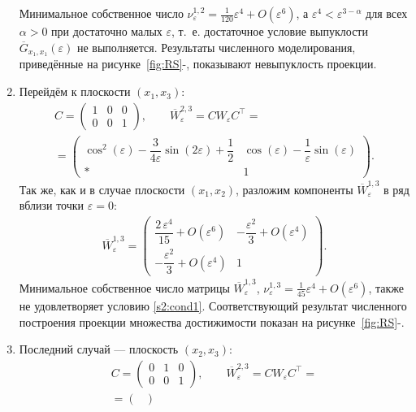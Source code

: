 \documentclass[../main.tex]{subfiles}
\begin{document}
\begin{enumerate}
 Минимальное собственное число $ \nu^{1,2}_{\varepsilon} = \frac{1}{120}\varepsilon^4 + O(\varepsilon^6)$, а $ \varepsilon^4 < \varepsilon^{3-\alpha} $ для всех $ \alpha > 0 $ при достаточно малых $ \varepsilon $, т.~е. достаточное условие выпуклости $ \overline{G}_{x_1, x_1}(\varepsilon) $ не выполняется. 
Результаты численного моделирования, приведённые на рисунке~\ref{fig:RS}-, показывают невыпуклость проекции. 
 \item Перейдём к плоскости $ (x_1,x_3) $:
 \begin{gather*}
 C = \begin{pmatrix}
 1 & 0 & 0 \\
 0 & 0 & 1
 \end{pmatrix}, \qquad
 \overline{W}_{\varepsilon}^{2,3} = C W_{\varepsilon} C^{\top} = \\ =\begin{pmatrix}
 \cos^2(\varepsilon)-\dfrac{3}{4\varepsilon}\sin(2\varepsilon)+\dfrac{1}{2} & 
 \cos\left(\varepsilon \right)-\dfrac{1}{\varepsilon} \sin\left(\varepsilon \right) \\ 
 * & 1
 \end{pmatrix}.
 \end{gather*}
 Так же, как и в случае плоскости $ (x_1,x_2) $, разложим компоненты $ \overline{W}_{\varepsilon}^{1,3} $ в ряд вблизи точки $ \varepsilon = 0 $:
 \begin{gather*}
 \overline{W}_{\varepsilon}^{1,3} = \begin{pmatrix} 
 \dfrac{2\,\varepsilon ^4}{15} + O(\varepsilon^6) &
 -\dfrac{\varepsilon^2}{3}+ O(\varepsilon ^4)\\[8pt]
 -\dfrac{\varepsilon^2}{3} + O(\varepsilon^4) & 1 \end{pmatrix}.
 \end{gather*}
 Минимальное собственное число матрицы $ \overline{W}_{\varepsilon}^{1,3} $, $ \nu^{1,3}_{\varepsilon} = \frac{1}{45}\varepsilon^4 + O(\varepsilon^6) $, также не удовлетворяет условию \eqref{s2:cond1}. 
Соответствующий результат численного построения проекции множества достижимости показан на рисунке~\ref{fig:RS}-.
 \item Последний случай --- плоскость $ (x_2,x_3) $:
 \begin{gather*}
 C = \begin{pmatrix}
 0 & 1 & 0 \\
 0 & 0 & 1
 \end{pmatrix}, \qquad
 \overline{W}_{\varepsilon}^{2,3} = C W_{\varepsilon} C^{\top} =\\=\begin{pmatrix}

\end{pmatrix}
\end{gather*}
\end{enumerate}
\end{document}
